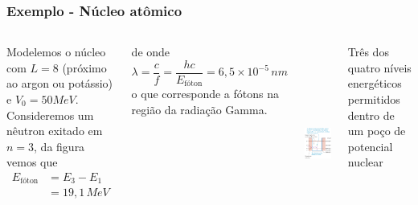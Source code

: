\documentclass[12pt,brazil,table]{beamer}
\begin{document}

\begin{frame}
  \frametitle{Exemplo - Núcleo atômico\\}
  
  \fontsize{9pt}{11pt}\selectfont
  \vspace*{-1.5cm}
  \begin{columns}
    
    Modelemos o núcleo com $L=8$  (próximo ao argon ou potássio) e $V_0=50 MeV$. Consideremos um nêutron exitado em $n=3$, da figura vemos que
    \begin{align*}
      E_{\text{fóton}} &= E_3 - E_1\\
      &= 19,1\,MeV     
    \end{align*}

    de onde
    \[
     \lambda = \dfrac{c}{f} = \dfrac{hc}{E_{\text{fóton}}}=6,5\times 10^{-5}\,nm
    \]
    o que corresponde a fótons na região da radiação Gamma.
    
    
    {\centering \vspace*{0.5cm}\includegraphics[height=6.5cm]{figuras/fig26}}
    
    \fontsize{6pt}{11pt}\selectfont
      Três dos quatro níveis energéticos permitidos dentro de um poço de potencial nuclear
  \end{columns}
   

\end{frame}


  
\end{document}
